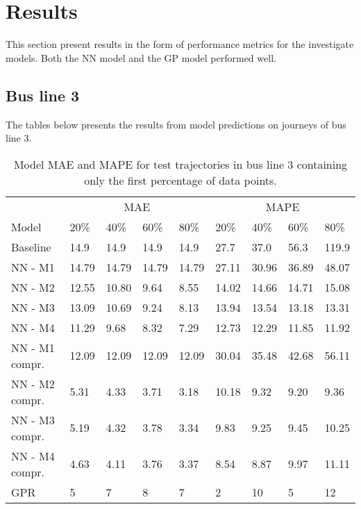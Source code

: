 
\captionsetup{width=.75\textwidth}


\chapter{Results}
\label{cha:results}
This section present results in the form of performance metrics for the investigate models. Both the NN model and the GP model performed well.

\section{Bus line 3}
The tables below presents the results from model predictions on journeys of bus line 3.
\begin{table}[H]
  \centering
  \caption{Model MAE and MAPE for test trajectories in bus line 3 containing only the first percentage of data points.}
  \label{tbl:models-mae-and-mape-203}
  \begin{tabular}{l | l | l | l | l || l | l | l | l }
    & \multicolumn{4}{c}{MAE} & \multicolumn{4}{c}{MAPE} \\
    Model      & 20\% & 40\% & 60\% & 80\% & 20\% & 40\% & 60\% & 80\% \\
    \hline
    Baseline & 14.9 & 14.9 & 14.9 & 14.9  & 27.7 & 37.0 & 56.3 & 119.9 \\
    NN - M1        & 14.79 &  14.79 & 14.79 &  14.79  & 27.11 & 30.96 & 36.89 & 48.07 \\
    NN - M2        & 12.55 &  10.80 & 9.64 &  8.55  & 14.02 & 14.66 & 14.71 & 15.08 \\
    NN - M3        & 13.09 &  10.69 & 9.24 &  8.13  & 13.94 & 13.54 & 13.18 & 13.31 \\
    NN - M4        & 11.29 &  9.68 & 8.32 &  7.29  & 12.73 & 12.29 & 11.85 & 11.92 \\
    NN - M1 compr.        & 12.09 &  12.09 & 12.09 &  12.09  & 30.04 & 35.48 & 42.68 & 56.11 \\
    NN - M2 compr.       & 5.31 &  4.33 & 3.71 &  3.18  & 10.18 & 9.32 & 9.20 & 9.36 \\
    NN - M3 compr.       & 5.19 &  4.32 & 3.78 &  3.34  & 9.83 & 9.25 & 9.45 & 10.25 \\
    NN - M4 compr.       & 4.63 &  4.11 & 3.76 &  3.37  & 8.54 & 8.87 & 9.97 & 11.11 \\
    GPR        & 5 &  7 & 8 &  7  & 2 & 10 & 5 & 12 \\
  \end{tabular}
\end{table}

